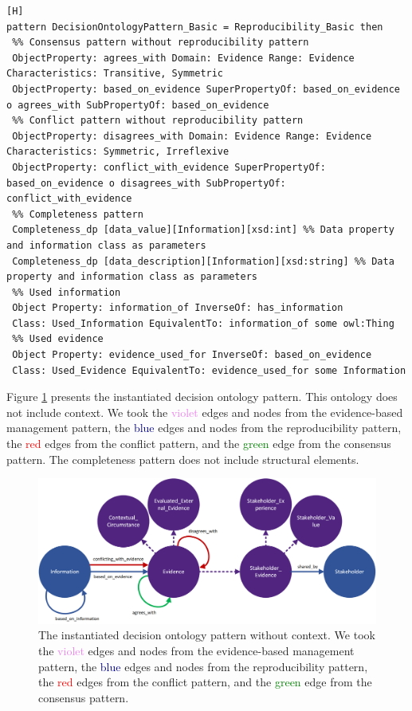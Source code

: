 \begin{lstlisting}[float,language=GDOL,caption={The base GDOL instantiation code for the decision ontology pattern. The instantiation code is a combination of the completeness, reproducibility, consensus, and conflict patterns.},label={GODP_DDP_Instantiation_Basic}][H]
pattern DecisionOntologyPattern_Basic = Reproducibility_Basic then
 %% Consensus pattern without reproducibility pattern
 ObjectProperty: agrees_with Domain: Evidence Range: Evidence Characteristics: Transitive, Symmetric
 ObjectProperty: based_on_evidence SuperPropertyOf: based_on_evidence o agrees_with SubPropertyOf: based_on_evidence
 %% Conflict pattern without reproducibility pattern
 ObjectProperty: disagrees_with Domain: Evidence Range: Evidence Characteristics: Symmetric, Irreflexive
 ObjectProperty: conflict_with_evidence SuperPropertyOf: based_on_evidence o disagrees_with SubPropertyOf: conflict_with_evidence
 %% Completeness pattern
 Completeness_dp [data_value][Information][xsd:int] %% Data property and information class as parameters
 Completeness_dp [data_description][Information][xsd:string] %% Data property and information class as parameters
 %% Used information
 Object Property: information_of InverseOf: has_information
 Class: Used_Information EquivalentTo: information_of some owl:Thing
 %% Used evidence
 Object Property: evidence_used_for InverseOf: based_on_evidence
 Class: Used_Evidence EquivalentTo: evidence_used_for some Information 
\end{lstlisting}
 
Figure \ref{fig:DecisionDesignPattern} presents the instantiated decision ontology pattern. This ontology does not include context. We took the \textcolor{Violet}{violet} edges and nodes from the evidence-based management pattern, the \textcolor{DarkBlue}{blue} edges and nodes from the reproducibility pattern, the \textcolor{Red}{red} edges from the conflict pattern, and the \textcolor{Green}{green} edge from the consensus pattern. The completeness pattern does not include structural elements.
 
\begin{figure}[H]
\centering
  \includegraphics[width=15cm]{../../Images/04_Contribution/04_DecisionDesignPattern.png}
  \caption{The instantiated decision ontology pattern without context. We took the \textcolor{Violet}{violet} edges and nodes from the evidence-based management pattern, the \textcolor{DarkBlue}{blue} edges and nodes from the reproducibility pattern, the \textcolor{Red}{red} edges from the conflict pattern, and the \textcolor{Green}{green} edge from the consensus pattern.}
  \label{fig:DecisionDesignPattern}
\end{figure}


